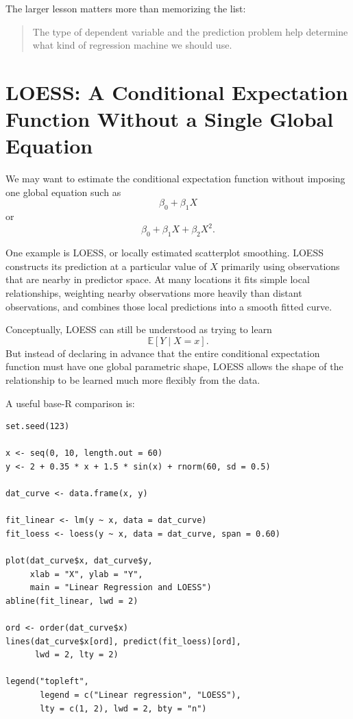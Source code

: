 \documentclass[11pt]{report}
\newcommand{\E}{\mathbb{E}}
\begin{document}
The larger lesson matters more than memorizing the list:

\begin{quote}
The type of dependent variable and the prediction problem help determine what kind of regression machine we should use.
\end{quote}

\section{LOESS: A Conditional Expectation Function Without a Single Global Equation}

We may want to estimate the conditional expectation function without imposing one global equation such as
\[
\beta_0+\beta_1X
\]
or
\[
\beta_0+\beta_1X+\beta_2X^2.
\]

One example is LOESS, or locally estimated scatterplot smoothing. LOESS constructs its prediction at a particular value of \(X\) primarily using observations that are nearby in predictor space. At many locations it fits simple local relationships, weighting nearby observations more heavily than distant observations, and combines those local predictions into a smooth fitted curve.

Conceptually, LOESS can still be understood as trying to learn
\[
\E[Y\mid X=x].
\]
But instead of declaring in advance that the entire conditional expectation function must have one global parametric shape, LOESS allows the shape of the relationship to be learned much more flexibly from the data.

A useful base-R comparison is:

\begin{lstlisting}
set.seed(123)

x <- seq(0, 10, length.out = 60)
y <- 2 + 0.35 * x + 1.5 * sin(x) + rnorm(60, sd = 0.5)

dat_curve <- data.frame(x, y)

fit_linear <- lm(y ~ x, data = dat_curve)
fit_loess <- loess(y ~ x, data = dat_curve, span = 0.60)

plot(dat_curve$x, dat_curve$y,
     xlab = "X", ylab = "Y",
     main = "Linear Regression and LOESS")
abline(fit_linear, lwd = 2)

ord <- order(dat_curve$x)
lines(dat_curve$x[ord], predict(fit_loess)[ord],
      lwd = 2, lty = 2)

legend("topleft",
       legend = c("Linear regression", "LOESS"),
       lty = c(1, 2), lwd = 2, bty = "n")
\end{lstlisting}
\end{document}
